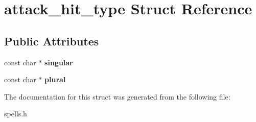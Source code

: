 \hypertarget{structattack__hit__type}{}\section{attack\+\_\+hit\+\_\+type Struct Reference}
\label{structattack__hit__type}
\subsection*{Public Attributes}
\begin{DoxyCompactItemize}
\item 
\mbox{\label{structattack__hit__type_a745fd360cb51a1d1b44aee0e5032314c}} 
const char $\ast$ {\bfseries singular}
\item 
\mbox{\label{structattack__hit__type_a1399da5ec2a0b1b2b6cfa4182ba0f5b6}} 
const char $\ast$ {\bfseries plural}
\end{DoxyCompactItemize}


The documentation for this struct was generated from the following file\+:\begin{DoxyCompactItemize}
\item 
spells.\+h\end{DoxyCompactItemize}
